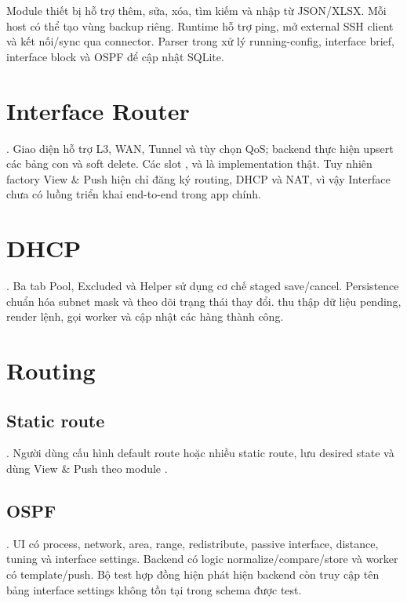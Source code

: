 Module thiết bị hỗ trợ thêm, sửa, xóa, tìm kiếm và nhập từ JSON/XLSX. Mỗi host có thể tạo vùng backup riêng. Runtime hỗ trợ ping, mở external SSH client và kết nối/sync qua connector. Parser trong  xử lý running-config, interface brief, interface block và OSPF để cập nhật SQLite.

\section{Interface Router}

\statuspartial. Giao diện hỗ trợ L3, WAN, Tunnel và tùy chọn QoS; backend thực hiện upsert các bảng con và soft delete. Các slot ,  và  là implementation thật. Tuy nhiên factory View \& Push hiện chỉ đăng ký routing, DHCP và NAT, vì vậy Interface chưa có luồng triển khai end-to-end trong app chính.

\section{DHCP}

\statusdone. Ba tab Pool, Excluded và Helper sử dụng cơ chế staged save/cancel. Persistence chuẩn hóa subnet mask và theo dõi trạng thái thay đổi.  thu thập dữ liệu pending, render lệnh, gọi worker và cập nhật các hàng thành công.

\section{Routing}

\subsection{Static route}

\statusdone. Người dùng cấu hình default route hoặc nhiều static route, lưu desired state và dùng View \& Push theo module .

\subsection{OSPF}

\statuspartial. UI có process, network, area, range, redistribute, passive interface, distance, tuning và interface settings. Backend có logic normalize/compare/store và worker có template/push. Bộ test hợp đồng hiện phát hiện backend còn truy cập tên bảng interface settings không tồn tại trong schema được test.


